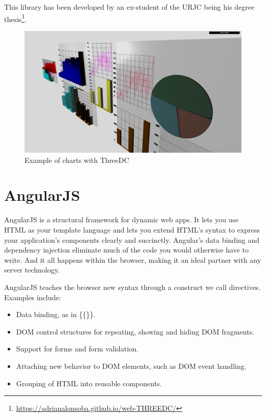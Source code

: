 \documentclass[a4paper, 12pt]{book}
\begin{document}
This library has been developed by an ex-student of the URJC being his degree thesis\footnote{\url{https://adrianalonsoba.github.io/web-THREEDC/}}.

\begin{figure}[H]
  \centering
  \includegraphics[width=16cm, keepaspectratio]{img/context/threedc.PNG}
  \caption{Example of charts with ThreeDC}
  \label{fig:pluginhtml}
\end{figure}

\section{AngularJS}
\label{sec:angular}
AngularJS is a structural framework for dynamic web apps. It lets you use HTML as your template language and lets you extend HTML's syntax to express your application's components clearly and succinctly. Angular's data binding and dependency injection eliminate much of the code you would otherwise have to write. And it all happens within the browser, making it an ideal partner with any server technology.

AngularJS teaches the browser new syntax through a construct we call directives. Examples include:

\begin{itemize}
\item Data binding, as in \{\{\}\}.
\item DOM control structures for repeating, showing and hiding DOM fragments.
\item Support for forms and form validation.
\item Attaching new behavior to DOM elements, such as DOM event handling.
\item Grouping of HTML into reusable components.
\end{itemize}
\end{document}
